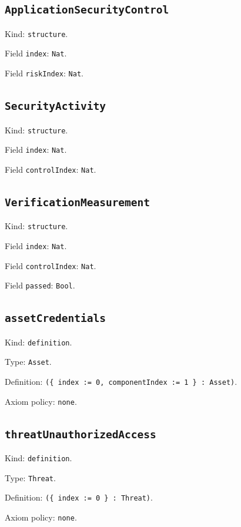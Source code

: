 \documentclass[11pt]{article}
\begin{document}
\subsection*{\texttt{ApplicationSecurityControl}}
\noindent Kind: \texttt{structure}.\par
\noindent Field \texttt{index}: \texttt{Nat}.\par
\noindent Field \texttt{riskIndex}: \texttt{Nat}.\par
\subsection*{\texttt{SecurityActivity}}
\noindent Kind: \texttt{structure}.\par
\noindent Field \texttt{index}: \texttt{Nat}.\par
\noindent Field \texttt{controlIndex}: \texttt{Nat}.\par
\subsection*{\texttt{VerificationMeasurement}}
\noindent Kind: \texttt{structure}.\par
\noindent Field \texttt{index}: \texttt{Nat}.\par
\noindent Field \texttt{controlIndex}: \texttt{Nat}.\par
\noindent Field \texttt{passed}: \texttt{Bool}.\par
\subsection*{\texttt{assetCredentials}}
\noindent Kind: \texttt{definition}.\par
\noindent Type: \texttt{Asset}.\par
\noindent Definition: \texttt{(\{ index := 0, componentIndex := 1 \} : Asset)}.\par
\noindent Axiom policy: \texttt{none}.\par
\subsection*{\texttt{threatUnauthorizedAccess}}
\noindent Kind: \texttt{definition}.\par
\noindent Type: \texttt{Threat}.\par
\noindent Definition: \texttt{(\{ index := 0 \} : Threat)}.\par
\noindent Axiom policy: \texttt{none}.\par
\end{document}
